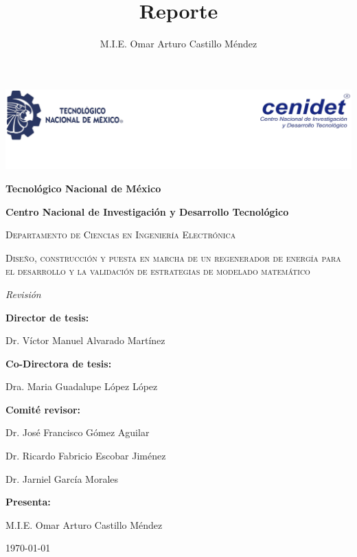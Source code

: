 \documentclass[12pt,letterpaper,final]{article}%
\title{Reporte }
\date{}
\author{M.I.E. Omar Arturo Castillo M\'endez}
\begin{document}
	\begin{titlepage}%
		\centering
		\includegraphics[scale=1]{logo}
		\vspace{0.1cm}
		{\bfseries\LARGE Tecnol\'ogico Nacional de M\'exico \par}
		{\bfseries\LARGE Centro Nacional de Investigaci\'on y Desarrollo Tecnol\'ogico \par}
		\vspace{0.25cm}
		{\scshape\Large Departamento de Ciencias en Ingenier\'ia Electr\'onica \par}
		\vspace{0.25cm}
		{\scshape\Large Diseño, construcci\'on y puesta en marcha de un regenerador de energ\'ia para el desarrollo y la validaci\'on de estrategias de modelado matem\'atico \par}
		\vspace{0.25cm}
		{\itshape\Large Revisión  \par}
		\vspace{0.25cm}
		{\bfseries Director de tesis: \par}
		\vspace{0.2cm}
		{Dr. V\'ictor Manuel Alvarado Mart\'inez \par}
		\vspace{0.2cm}
		{\bfseries Co-Directora de tesis: \par}
		\vspace{0.2cm}
		{Dra. Maria Guadalupe L\'opez L\'opez \par}
		\vspace{0.2cm}
		{\bfseries Comit\'e revisor: \par}
		\vspace{0.2cm}
		{Dr. Jos\'e Francisco G\'omez Aguilar \par}
		\vspace{0.2cm}
		{Dr. Ricardo Fabricio Escobar Jim\'enez  \par}
		\vspace{0.2cm}
		{Dr. Jarniel Garc\'ia Morales \par}
		\vspace{0.2cm}
		{\bfseries Presenta: \par}
		{M.I.E. Omar Arturo Castillo M\'endez \par}
		\vspace{0.2cm}
		{\today \par}
	\end{titlepage}
	\newpage
	\setcounter{page}{1}
\end{document}
